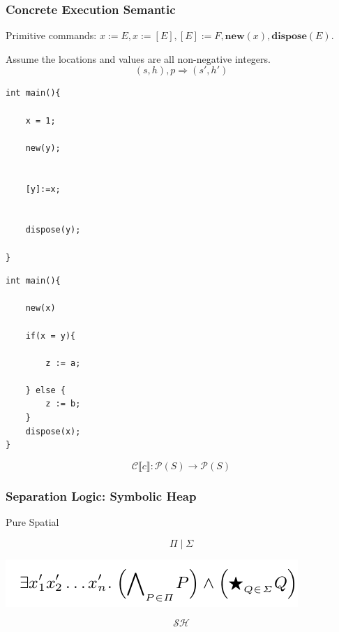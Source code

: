 \documentclass[aspectratio=1610, 13pt]{beamer}
\begin{document}
\begin{frame}[fragile]\frametitle{Concrete Execution Semantic}
Primitive commands: $x:=E,x:=[E],[E]:=F,\mathbf{new}(x),\mathbf{dispose}(E)$.

Assume the locations and values are all non-negative integers.
\[(s,h), p\Longrightarrow (s',h')\]
\begin{multicols}{2}
\begin{lstlisting}
int main(){

	x = 1;
	
	new(y);
	
	
	[y]:=x;


	dispose(y);
	
}

\end{lstlisting}

\begin{lstlisting}
int main(){

	new(x)
	
	if(x = y){
	
		z := a;
		
	} else {
		z := b;
	}
	dispose(x);
}

\end{lstlisting}\[\mathcal{C}\llbracket c \rrbracket : \mathcal{P}(S) \rightarrow \mathcal{P}(S) \]
\end{multicols}
\end{frame}

\begin{frame}\frametitle{Separation Logic: Symbolic Heap}
\begin{center}
Pure \qquad  Spatial
\end{center}
\huge
\[\Pi \mid \Sigma \]
\small
\vspace{10em}
\begin{center}
        \includegraphics[scale=0.4]{sl_form.png}
    \end{center}
    \[\mathcal{SH}\]
\end{frame}
\end{document}
